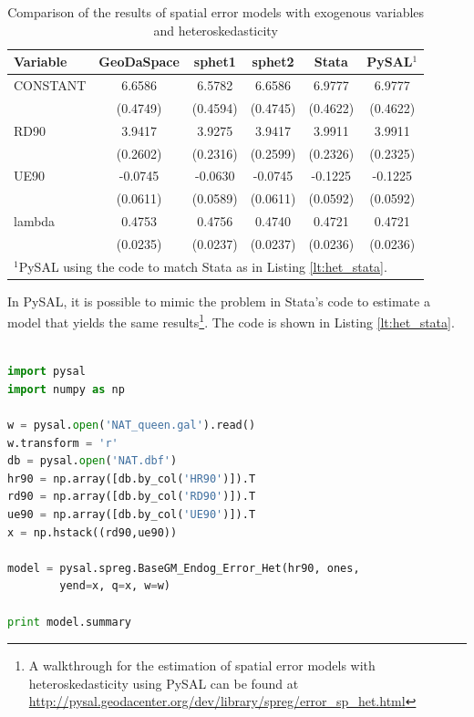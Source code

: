 \documentclass{article}
\begin{document}
\begin{table}[htpb]
\caption{Comparison of the results of spatial error models with exogenous variables and heteroskedasticity}
\label{t:res_het}
\centering
\begin{small}
\begin{tabular}{l|ccccc} \hline
\textbf{Variable}&\textbf{GeoDaSpace}&\textbf{sphet1}&\textbf{sphet2}&\textbf{Stata}&\textbf{PySAL$^1$}\\ \hline
CONSTANT&6.6586&6.5782&6.6586&6.9777&6.9777\\
&(0.4749)&(0.4594)&(0.4745)&(0.4622)&(0.4622)\\
RD90&3.9417&3.9275&3.9417&3.9911&3.9911\\
&(0.2602)&(0.2316)&(0.2599)&(0.2326)&(0.2325)\\
UE90&-0.0745&-0.0630&-0.0745&-0.1225&-0.1225\\
&(0.0611)&(0.0589)&(0.0611)&(0.0592)&(0.0592)\\
lambda&0.4753&0.4756&0.4740&0.4721&0.4721\\
&(0.0235)&(0.0237)&(0.0237)&(0.0236)&(0.0236)\\
\hline
\multicolumn{6}{l}{\scriptsize{$^1$PySAL using the code to match Stata as in Listing \ref{lt:het_stata}.}} \\
\end{tabular}
\end{small}
\end{table}

In PySAL, it is possible to mimic the problem in Stata's code to estimate a model that yields the same results\footnote{A walkthrough for the estimation of spatial error models with heteroskedasticity using PySAL can be found at \url{http://pysal.geodacenter.org/dev/library/spreg/error_sp_het.html}}. The code is shown in Listing \ref{lt:het_stata}.

\begin{code}
\begin{lstlisting}[label=lt:het_stata,caption=Using PySAL to match the results of spatial error models with heteroskedasticity from Stata,language=Python]

import pysal
import numpy as np

w = pysal.open('NAT_queen.gal').read()
w.transform = 'r'
db = pysal.open('NAT.dbf')
hr90 = np.array([db.by_col('HR90')]).T
rd90 = np.array([db.by_col('RD90')]).T
ue90 = np.array([db.by_col('UE90')]).T
x = np.hstack((rd90,ue90))

model = pysal.spreg.BaseGM_Endog_Error_Het(hr90, ones,
        yend=x, q=x, w=w)

print model.summary

\end{lstlisting}
\end{code}
\end{document}

